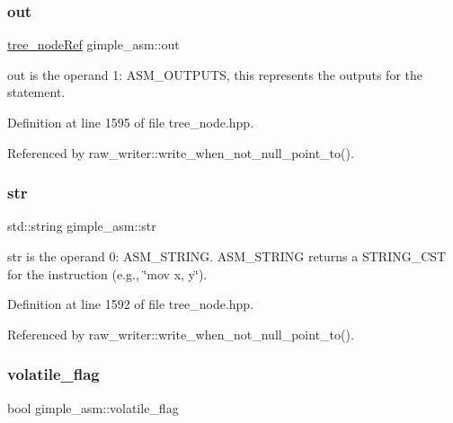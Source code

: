 \subsubsection{\texorpdfstring{out}{out}}
{\footnotesize\ttfamily \hyperlink{tree__node_8hpp_a6ee377554d1c4871ad66a337eaa67fd5}{tree\+\_\+node\+Ref} gimple\+\_\+asm\+::out}



out is the operand 1\+: A\+S\+M\+\_\+\+O\+U\+T\+P\+U\+TS, this represents the outputs for the statement. 



Definition at line 1595 of file tree\+\_\+node.\+hpp.



Referenced by raw\+\_\+writer\+::write\+\_\+when\+\_\+not\+\_\+null\+\_\+point\+\_\+to().

\mbox{\label{structgimple__asm_a701f4a2b5bb448ea6dd172aaa75fad27}} 
\subsubsection{\texorpdfstring{str}{str}}
{\footnotesize\ttfamily std\+::string gimple\+\_\+asm\+::str}



str is the operand 0\+: A\+S\+M\+\_\+\+S\+T\+R\+I\+NG. A\+S\+M\+\_\+\+S\+T\+R\+I\+NG returns a S\+T\+R\+I\+N\+G\+\_\+\+C\+ST for the instruction (e.\+g., \char`\"{}mov x, y\char`\"{}). 



Definition at line 1592 of file tree\+\_\+node.\+hpp.



Referenced by raw\+\_\+writer\+::write\+\_\+when\+\_\+not\+\_\+null\+\_\+point\+\_\+to().

\mbox{\label{structgimple__asm_a0ae87790fe89d89a037353543d4ea531}} 
\subsubsection{\texorpdfstring{volatile\+\_\+flag}{volatile\_flag}}
{\footnotesize\ttfamily bool gimple\+\_\+asm\+::volatile\+\_\+flag}




